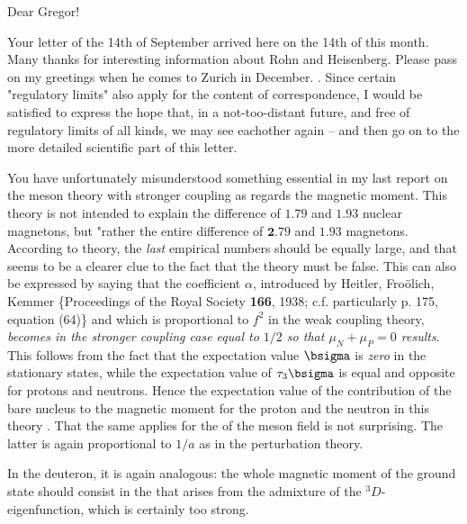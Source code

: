 \date{October 16, 1942}


Dear Gregor!

Your letter of the 14th of September arrived here on the 14th of this month. Many thanks for interesting information about Rohn and Heisenberg. Please pass on my greetings when he comes to Zurich in December. . Since certain "regulatory limits" also apply for the content of correspondence, I would be satisfied to express the hope that, in a not-too-distant future, and free of regulatory limits of all kinds, we may see eachother again -- and then go on to the more detailed scientific part of this letter.

You have unfortunately misunderstood something essential in my last report on the meson theory with stronger coupling as regards the magnetic moment. This theory is not intended to explain the difference of $1.79$ and $1.93$ nuclear magnetons, but "rather the entire difference of $\textbf{2}.79$ and $1.93$ magnetons. According to theory, the \textit{last} empirical numbers should be equally large, and that seems to be a clearer clue to the fact that the theory must be false. This can also be expressed by saying that the coefficient $\alpha$, introduced by Heitler, Fro\"olich, Kemmer \{Proceedings of the Royal Society \textbf{166}, 1938; c.f. particularly p. 175, equation (64)\} and which is proportional to $f^2$ in the weak coupling theory, \textit{becomes in the stronger coupling case equal to $1/2$ so that $\mu_N + \mu_P = 0$ results}. This follows from the fact that the expectation value $\bsigma$ is \textit{zero} in the stationary states, while the expectation value of $\tau_3\bsigma$ is equal and opposite for protons and neutrons. Hence the expectation value of the contribution of the bare nucleus
to the magnetic moment for the proton and the neutron in this theory . That the same applies for the  of the meson field is not surprising. The latter is again proportional to $1/a$ as in the perturbation theory.

In the deuteron, it is again analogous: the whole magnetic moment of the ground state should consist in the that arises from the admixture of the ${}^3D$-eigenfunction, which is certainly too strong.

